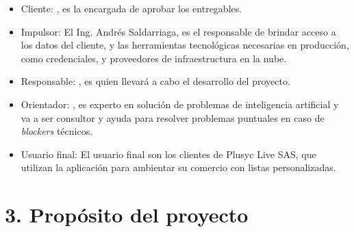 \documentclass[
11pt, %
]{charter}
\begin{document}



 

\begin{itemize}
	\item Cliente: \clientename, es la encargada de aprobar los entregables.
  \item Impulsor: El Ing. Andrés Saldarriaga, es el responsable de brindar acceso a los datos del cliente, y las herramientas tecnológicas necesarias en producción, como credenciales, y proveedores de infraestructura en la nube.
  \item Responsable: \authorname, es quien llevará a cabo el desarrollo del proyecto.
	\item Orientador: \supname, es experto en solución de problemas de inteligencia artificial y va a ser consultor y ayuda para resolver problemas puntuales en caso de \textit{blockers} técnicos.
  \item Usuario final: El usuario final son los clientes de Plusyc Live SAS, que utilizan la aplicación para ambientar su comercio con listas personalizadas.
\end{itemize}


\section{3. Propósito del proyecto}
\label{sec:proposito}



\end{document}
